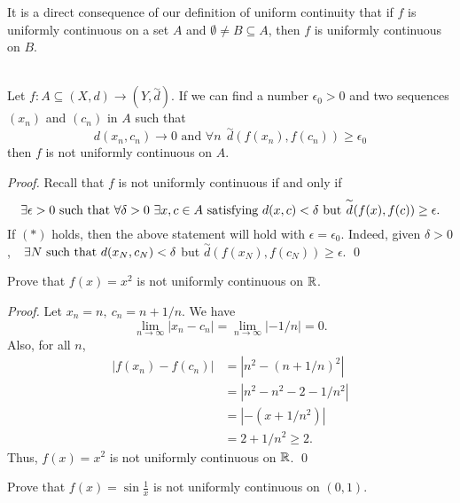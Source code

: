 \begin{remark}
    It is a direct consequence of our definition of uniform continuity that if $f$ is uniformly continuous on a set $A$ and $\emptyset \not = B \subseteq A$, then $f$ is uniformly continuous on $B$.
\end{remark}

\begin{theorem} \leavevmode \\
    Let $f:A \subseteq (X,d) \to (Y, \overset{\sim}{d})$. If we can find a number $\epsilon_0 > 0$ and two sequences $(x_n)$ and $(c_n)$ in $A$ such that 
    \begin{equation*}
        d(x_n, c_n) \to 0 \text{ and } \forall n ~~\overset{\sim}{d}(f(x_n), f(c_n)) \geq \epsilon_0
        \tag{$*$}
    \end{equation*}
    then $f$ is not uniformly continuous on $A$.
\end{theorem}

\begin{proof}
    Recall that $f$ is not uniformly continuous if and only if 
    $$\exists \epsilon > 0 \text{ such that } \forall \delta > 0 ~\exists x, c \in A \text{ satisfying $d(x,c) < \delta$ but $\overset{\sim}{d}(f(x), f(c)) \geq \epsilon$.}$$
If $(*)$ holds, then the above statement will hold with $\epsilon = \epsilon_0$. Indeed, given $\delta > 0$, $~~\exists N \text{ such that } d(x_N, c_N) < \delta$ but $\overset{\sim}{d}(f(x_N), f(c_N)) \geq \epsilon.$ \qed
\end{proof}

\begin{example}
    Prove that $f(x) = x^2$ is not uniformly continuous on $\mathbb{R}$.
\end{example}

\begin{proof}
    Let $x_n = n, ~c_n = n + 1/n.$ We have 
    $$\lim \limits_{n\to \infty} |x_n - c_n| = \lim \limits_{n \to \infty}|-1/n| = 0.$$
    Also, for all $n$,
    \begin{align*}
        |f(x_n) - f(c_n)| &= |n^2 - (n + 1/n)^2| \\
        &= |n^2 - n^2 - 2 - 1 / n^2| \\
        &= |-(x + 1/n^2)| \\
        &= 2 + 1/n^2 \geq 2.
    \end{align*}
    Thus, $f(x) = x^2$ is not uniformly continuous on $\mathbb{R}$. \qed
\end{proof}

\begin{example}
    Prove that $f(x) = \sin \frac{1}{x}$ is not uniformly continuous on $(0,1)$.
\end{example}

